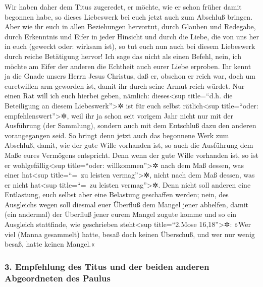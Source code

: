  Wir haben daher dem Titus zugeredet, er möchte, wie er
schon früher damit begonnen habe, so dieses Liebeswerk bei euch jetzt
auch zum Abschluß bringen.  Aber wie ihr euch in allen
Beziehungen hervortut, durch Glauben und Redegabe, durch Erkenntnis und
Eifer in jeder Hinsicht und durch die Liebe, die von uns her in euch
(geweckt oder: wirksam ist), so tut euch nun auch bei diesem Liebeswerk
durch reiche Betätigung hervor!  Ich sage das nicht als
einen Befehl, nein, ich möchte am Eifer der anderen die Echtheit auch
eurer Liebe erproben.  Ihr kennt ja die Gnade unsers Herrn
Jesus Christus, daß er, obschon er reich war, doch um euretwillen arm
geworden ist, damit ihr durch seine Armut reich würdet. 
Nur einen Rat will ich euch hierbei geben, nämlich: dieses\textless sup
title=``d.h. die Beteiligung an diesem Liebeswerk''\textgreater✲ ist für
euch selbst rätlich\textless sup title=``oder:
empfehlenswert''\textgreater✲, weil ihr ja schon seit vorigem Jahr nicht
nur mit der Ausführung (der Sammlung), sondern auch mit dem Entschluß
dazu den anderen vorangegangen seid.  So bringt denn
jetzt auch das begonnene Werk zum Abschluß, damit, wie der gute Wille
vorhanden ist, so auch die Ausführung dem Maße eures Vermögens
entspricht.  Denn wenn der gute Wille vorhanden ist, so
ist er wohlgefällig\textless sup title=``oder: willkommen''\textgreater✲
nach dem Maß dessen, was einer hat\textless sup title=``=~zu leisten
vermag''\textgreater✲, nicht nach dem Maß dessen, was er nicht
hat\textless sup title=``=~zu leisten vermag''\textgreater✲.
 Denn nicht soll anderen eine Entlastung, euch selbst
aber eine Belastung geschaffen werden; nein, des Ausgleichs wegen
 soll diesmal euer Überfluß dem Mangel jener abhelfen,
damit (ein andermal) der Überfluß jener eurem Mangel zugute komme und so
ein Ausgleich stattfinde,  wie geschrieben
steht\textless sup title=``2.Mose 16,18''\textgreater✲: »Wer viel (Manna
gesammelt) hatte, besaß doch keinen Überschuß, und wer nur wenig besaß,
hatte keinen Mangel.«

\hypertarget{empfehlung-des-titus-und-der-beiden-anderen-abgeordneten-des-paulus}{%
\subsubsection{3. Empfehlung des Titus und der beiden anderen
Abgeordneten des
Paulus}\label{empfehlung-des-titus-und-der-beiden-anderen-abgeordneten-des-paulus}}

